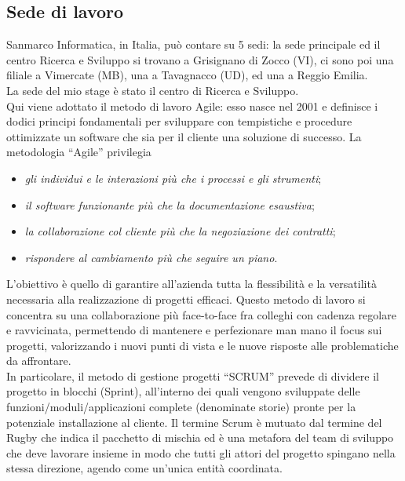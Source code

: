 \subsection{Sede di lavoro}
Sanmarco Informatica, in Italia, può contare su 5 sedi: la sede principale ed il centro Ricerca e Sviluppo si trovano a Grisignano di Zocco (VI), ci sono poi una filiale a Vimercate (MB), una a Tavagnacco (UD), ed una a Reggio Emilia.\\
La sede del mio stage è stato il centro di Ricerca e Sviluppo.\\
Qui viene adottato il metodo di lavoro Agile: esso nasce nel 2001 e definisce i dodici principi fondamentali per sviluppare con tempistiche e procedure ottimizzate un software che sia per il cliente una soluzione di successo. La metodologia “Agile” privilegia
\begin{itemize}
	\item \emph{gli individui e le interazioni più che i processi e gli strumenti}; 
	\item \emph{il software funzionante più che la documentazione esaustiva}; 
	\item \emph{la collaborazione col cliente più che la negoziazione dei contratti}; 
	\item \emph{rispondere al cambiamento più che seguire un piano}. 
\end{itemize} 
	L’obiettivo è quello di garantire all’azienda tutta la flessibilità e la versatilità necessaria alla realizzazione di progetti efficaci. Questo metodo di lavoro si concentra su una collaborazione più face-to-face fra colleghi con cadenza regolare e ravvicinata, permettendo di mantenere e perfezionare man mano il focus sui progetti, valorizzando i nuovi punti di vista e le nuove risposte alle problematiche da affrontare. \\ In particolare, il metodo di gestione progetti “SCRUM” prevede di dividere il progetto in blocchi (Sprint), all’interno dei quali vengono sviluppate delle funzioni/moduli/applicazioni complete (denominate storie) pronte per la potenziale installazione al cliente. Il termine Scrum è mutuato dal termine del Rugby che indica il pacchetto di mischia ed è una metafora del team di sviluppo che deve lavorare insieme in modo che tutti gli attori del progetto spingano nella stessa direzione, agendo come un’unica entità coordinata.


